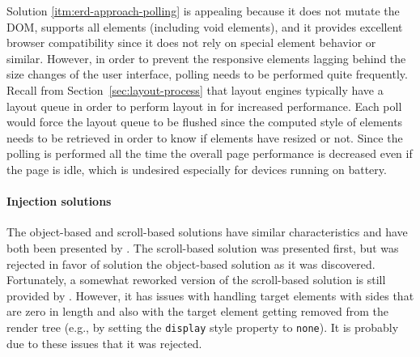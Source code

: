\documentclass[a4paper,11pt]{kth-mag}
\newcommand{\code}[1]{\texttt{#1}}
\begin{document}
        Solution \ref{itm:erd-approach-polling} is appealing because it does not mutate the \gls{DOM}, supports all elements (including void elements), and it provides excellent \gls{browser} compatibility since it does not rely on special \gls{element} behavior or similar.
        However, in order to prevent the \gls{responsive} \glspl{element} lagging behind the size changes of the user interface, polling needs to be performed quite frequently.
        Recall from Section~\ref{sec:layout-process} that \glspl{layout engine} typically have a layout queue in order to perform layout in  for increased performance.
        Each poll would force the layout queue to be flushed since the computed style of \glspl{element} needs to be retrieved in order to know if \glspl{element} have resized or not.
        Since the polling is performed all the time the overall page performance is decreased even if the page is idle, which is undesired especially for devices running on battery.

        \paragraph{Injection solutions}
        The object-based and scroll-based solutions have similar characteristics and have both been presented by \cite{backalley}.
        The scroll-based solution was presented first, but was rejected in favor of solution the object-based solution as it was discovered.
        Fortunately, a somewhat reworked version of the scroll-based solution is still provided by \cite{eq_imp_css-element-queries}.        
        However, it has issues with handling target elements with sides that are zero in length and also with the target element getting removed from the render tree (e.g., by setting the \code{display} style property to \code{none}).
        It is probably due to these issues that it was rejected.
\end{document}
